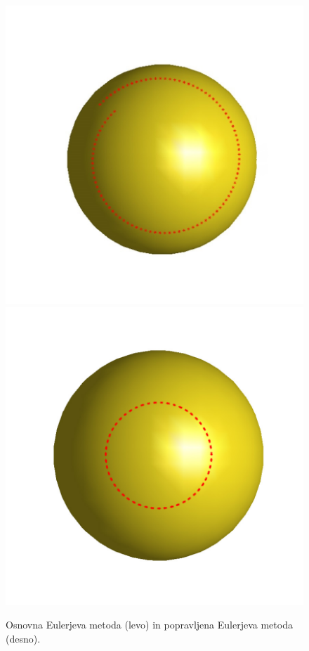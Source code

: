 \documentclass[12pt]{article}
\begin{document}
    \begin{figure}[H]
        \centering
        \includegraphics[scale=0.3]{eul1}
	    \includegraphics[scale=0.3]{eul3_newt}
	    \caption{Osnovna Eulerjeva metoda (levo) in popravljena Eulerjeva metoda (desno).}
    	\label{slika:eul1,eul3_newt}
	\end{figure}
\end{document}

